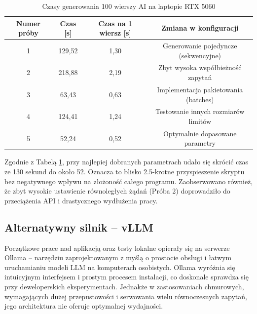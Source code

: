 \begin{table}[H]
    \centering
    \begin{tabular}{|c|c|c|c|}
        \hline
        \textbf{Numer próby} & \textbf{Czas [s]} & \textbf{Czas na 1 wiersz [s]} & \textbf{Zmiana w konfiguracji}       \\
        \hline
        1                    & 129,52            & 1,30                          & Generowanie pojedyncze (sekwencyjne) \\
        \hline
        2                    & 218,88            & 2,19                          & Zbyt wysoka współbieżność zapytań    \\
        \hline
        3                    & 63,43             & 0,63                          & Implementacja pakietowania (batches) \\
        \hline
        4                    & 124,41            & 1,24                          & Testowanie innych rozmiarów limitów  \\
        \hline
        5                    & 52,24             & 0,52                          & Optymalnie dopasowane parametry      \\
        \hline
    \end{tabular}
    \caption{Czasy generowania 100 wierszy AI na laptopie RTX 5060}
    \label{tab:llm_optimization_100}
\end{table}

Zgodnie z Tabelą \ref{tab:llm_optimization_100}, przy najlepiej dobranych parametrach udało się skrócić czas ze 130 sekund do około 52. Oznacza to blisko 2.5-krotne przyspieszenie skryptu bez negatywnego wpływu na złożoność całego programu. Zaobserwowano również, że zbyt wysokie ustawienie równoległych żądań (Próba 2) doprowadziło do przeciążenia API i drastycznego wydłużenia pracy.

\subsection*{Alternatywny silnik -- vLLM}

Początkowe prace nad aplikacją oraz testy lokalne opierały się na serwerze Ollama \cite{ollama} -- narzędziu zaprojektowanym z myślą o prostocie obsługi i łatwym uruchamianiu modeli LLM na komputerach osobistych. Ollama wyróżnia się intuicyjnym interfejsem i prostym procesem instalacji, co doskonale sprawdza się przy deweloperskich eksperymentach. Jednakże w zastosowaniach chmurowych, wymagających dużej przepustowości i serwowania wielu równoczesnych zapytań, jego architektura nie oferuje optymalnej wydajności.


